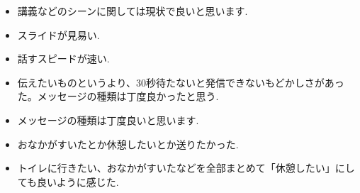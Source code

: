 \documentclass{funthesis}
\begin{document}
\begin{itemize}
\setlength{\itemsep}{-0.5mm} %
  \setlength{\parskip}{-0.5mm} %
 \item 講義などのシーンに関しては現状で良いと思います.\\
 \item スライドが見易い.\\
 \item 話すスピードが速い.\\
 \item 伝えたいものというより、30秒待たないと発信できないもどかしさがあった。メッセージの種類は丁度良かったと思う.\\
 \item メッセージの種類は丁度良いと思います.\\
 \item おなかがすいたとか休憩したいとか送りたかった.\\
 \item トイレに行きたい、おなかがすいたなどを全部まとめて「休憩したい」にしても良いように感じた.\\
\end{itemize}
\end{document}
